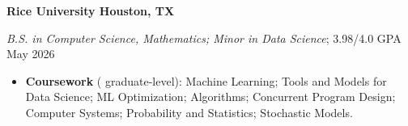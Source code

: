 \textbf{Rice University \hfill Houston, TX} \par
\textit{B.S. in Computer Science, Mathematics; Minor in Data Science}; 3.98/4.0 GPA \hfill May 2026\par
\begin{itemize}
    \item \textbf{Coursework} (\textsuperscript{\textdagger} graduate-level): Machine Learning\textsuperscript{\textdagger}; Tools and Models for Data Science\textsuperscript{\textdagger}; ML Optimization\textsuperscript{\textdagger}; Algorithms; Concurrent Program Design; Computer Systems; Probability and Statistics; Stochastic Models.
\end{itemize}